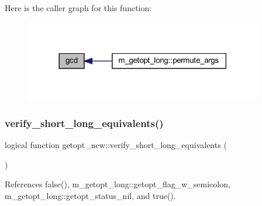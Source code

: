 Here is the caller graph for this function\+:
\nopagebreak
\begin{figure}[H]
\begin{center}
\leavevmode
\includegraphics[width=294pt]{M__getopt__long_8f90_a45f7c3be12facd750a4b03528039d66c_icgraph}
\end{center}
\end{figure}
\mbox{\label{M__getopt__long_8f90_aa269c37cf5c19077d40736e1d0557e3d}} 
\subsubsection{\texorpdfstring{verify\+\_\+short\+\_\+long\+\_\+equivalents()}{verify\_short\_long\_equivalents()}}
{\footnotesize\ttfamily logical function getopt\+\_\+new\+::verify\+\_\+short\+\_\+long\+\_\+equivalents (\begin{DoxyParamCaption}{ }\end{DoxyParamCaption})}



References false(), m\+\_\+getopt\+\_\+long\+::getopt\+\_\+flag\+\_\+w\+\_\+semicolon, m\+\_\+getopt\+\_\+long\+::getopt\+\_\+status\+\_\+nil, and true().


